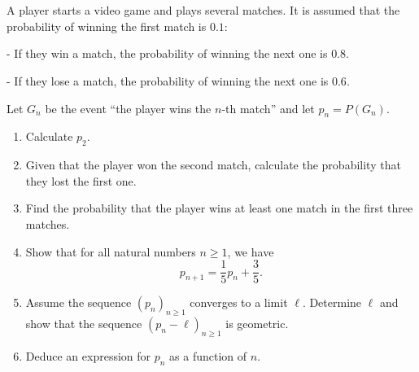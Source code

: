 \documentclass[12pt]{article}
\begin{document}
\section{}
A player starts a video game and plays several matches. It is assumed that the probability of winning the first match is \( 0.1 \):  

- If they win a match, the probability of winning the next one is \( 0.8 \).  

- If they lose a match, the probability of winning the next one is \( 0.6 \).  

Let \( G_n \) be the event “the player wins the \( n \)-th match” and let \( p_n = P(G_n) \).

\begin{enumerate}
    \item Calculate \( p_2 \).
    \item Given that the player won the second match, calculate the probability that they lost the first one.
    \item Find the probability that the player wins at least one match in the first three matches.
    \item Show that for all natural numbers \( n \geq 1 \), we have  
    \[
    p_{n+1} = \frac{1}{5} p_n + \frac{3}{5}.
    \]
    \item Assume the sequence \( (p_n)_{n \geq 1} \) converges to a limit \( \ell \). Determine \( \ell \) and show that the sequence \( (p_n - \ell)_{n \geq 1} \) is geometric.
    \item Deduce an expression for \( p_n \) as a function of \( n \).
\end{enumerate}
\end{document}

